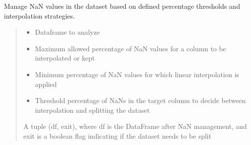 \documentclass[letterpaper,10pt,english]{sphinxmanual}
\begin{document}
\begin{fulllineitems}
\begin{fulllineitems}
\end{fulllineitems}


\begin{fulllineitems}
\label{\detokenize{docs/data_preprocessing:data_preprocessing.DataPreprocessor.manage_nan}}
\pysigstartsignatures
{}
\pysigstopsignatures
\sphinxAtStartPar
Manage NaN values in the dataset based on defined percentage thresholds and interpolation strategies.
\begin{quote}\begin{description}
\begin{itemize}
\item {} 
\sphinxAtStartPar
{} \textendash{} Dataframe to analyze

\item {} 
\sphinxAtStartPar
{} \textendash{} Maximum allowed percentage of NaN values for a column to be interpolated or kept

\item {} 
\sphinxAtStartPar
{} \textendash{} Minimum percentage of NaN values for which linear interpolation is applied

\item {} 
\sphinxAtStartPar
{} \textendash{} Threshold percentage of NaNs in the target column to decide between interpolation and splitting the dataset

\end{itemize}

\sphinxAtStartPar
A tuple (df, exit), where df is the DataFrame after NaN management, and exit is a boolean flag indicating if the dataset needs to be split

\end{description}\end{quote}


\end{fulllineitems}
\end{fulllineitems}
\end{document}
